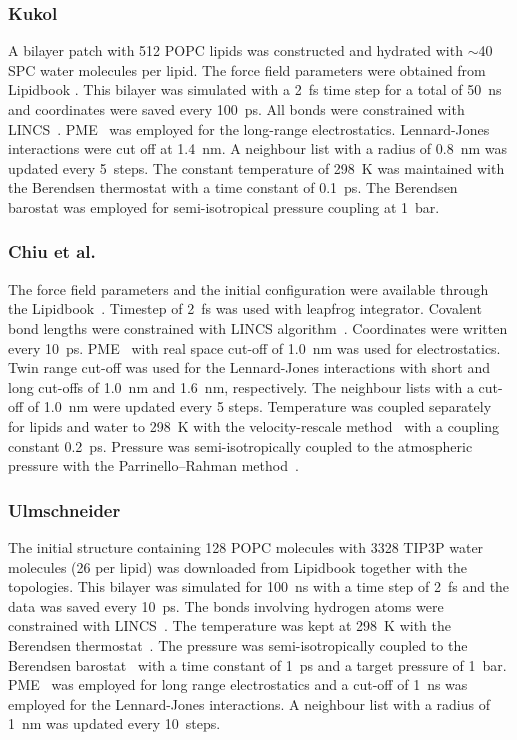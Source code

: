 \documentclass[journal=jacsat,manuscript=article]{achemso}
\begin{document}
\subsubsection{Kukol}
A bilayer patch with 512 POPC lipids was constructed and hydrated with $\sim$40 SPC water molecules per lipid. 
The force field parameters were obtained from Lipidbook \cite{domanski10}.
This bilayer was simulated with a 2~fs time step for a total of 50~ns and coordinates were saved every 100~ps. 
All bonds were constrained with LINCS~\cite{hess97,hess07}. PME~\cite{darden93,essman95} was employed for the long-range electrostatics. Lennard-Jones interactions 
were cut off at 1.4~nm. A neighbour list with a radius of 0.8~nm was updated every 5~steps. The constant temperature of 298~K 
was maintained with the Berendsen thermostat \cite{berendsen84} with a time constant of 0.1~ps. The Berendsen barostat \cite{berendsen84} 
was employed for semi-isotropical pressure coupling at 1~bar.

\subsubsection{Chiu et al.}
The force field parameters and the initial configuration were available through the Lipidbook~\cite{domanski10}.
Timestep of 2~fs was used with leapfrog integrator. Covalent bond lengths were constrained with LINCS algorithm~\cite{hess97,hess07}. 
Coordinates were written every 10~ps. PME~\cite{darden93,essman95} with real space cut-off of 1.0~nm was used 
for electrostatics. Twin range cut-off was used for the Lennard-Jones interactions with short and long cut-offs of 1.0~nm and 1.6~nm, respectively.
The neighbour lists with a cut-off of 1.0~nm were updated every 5 steps. Temperature was coupled separately
for lipids and water to 298~K with the velocity-rescale method~\cite{bussi07} with a coupling constant 0.2~ps.
Pressure was semi-isotropically coupled to the atmospheric pressure with the Parrinello--Rahman method~\cite{parrinello81}.

\subsubsection{Ulmschneider}
The initial structure containing 128 POPC molecules with 3328 TIP3P water~\cite{jorgensen83} molecules (26 per lipid) was downloaded from Lipidbook \cite{domanski10} 
together with the topologies. This bilayer was simulated for 100~ns with a time step of 2~fs and the data was saved every 10~ps. The bonds involving hydrogen atoms were 
constrained with LINCS~\cite{hess97,hess07}. The temperature was kept at 298~K with the Berendsen thermostat~\cite{berendsen84}. The pressure was semi-isotropically coupled to the Berendsen 
barostat~\cite{berendsen84} with a time constant of 1~ps and a target pressure of 1~bar. PME~\cite{darden93,essman95} was employed for long range electrostatics and a cut-off of 1~ns was employed for 
the Lennard-Jones interactions. A neighbour list with a radius of 1~nm was updated every 10~steps. 
\end{document}
